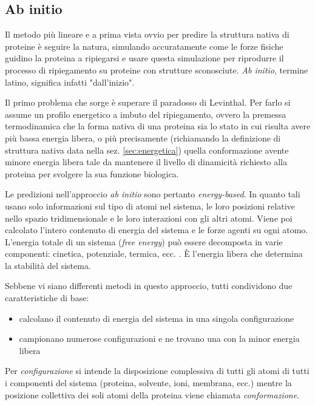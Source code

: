 \subsection{Ab initio}
Il metodo più lineare e a prima vista ovvio per predire la struttura nativa di proteine è seguire la natura, simulando accuratamente come le forze fisiche guidino la proteina a ripiegarsi e usare questa simulazione per riprodurre il processo di ripiegamento su proteine con strutture sconosciute. \textit{Ab initio}, termine latino, significa infatti "dall'inizio".

\par Il primo problema che sorge è superare il paradosso di Levinthal. Per farlo si assume un profilo energetico a imbuto del ripiegamento, ovvero la premessa termodinamica che la forma nativa di una proteina sia lo stato in cui risulta avere più bassa energia libera, o più precisamente (richiamando la definizione di struttura nativa data nella sez. \ref{sec:energetica}) quella conformazione avente minore energia libera tale da mantenere il livello di dinamicità richiesto alla proteina per svolgere la sua funzione biologica.

\par Le predizioni nell'approccio \textit{ab initio} sono pertanto \textit{energy-based}. In quanto tali usano solo informazioni sul tipo di atomi nel sistema, le loro posizioni relative nello spazio tridimensionale e le loro interazioni con gli altri atomi. Viene poi calcolato l'intero contenuto di energia del sistema e le forze agenti su ogni atomo. L'energia totale di un sistema (\textit{free energy}) può essere decomposta in varie componenti: cinetica, potenziale, termica, ecc. . È l'energia libera che determina la stabilità del sistema.

\par Sebbene vi siano differenti metodi in questo approccio, tutti condividono due caratteristiche di base:
\begin{itemize}
	\item calcolano il contenuto di energia del sistema in una singola configurazione
	\item campionano numerose configurazioni e ne trovano una con la minor energia libera
\end{itemize}

Per \textit{configurazione} si intende la disposizione complessiva di tutti gli atomi di tutti i componenti del sistema (proteina, solvente, ioni, membrana, ecc.) mentre la posizione collettiva dei soli atomi della proteina viene chiamata \textit{conformazione}.

